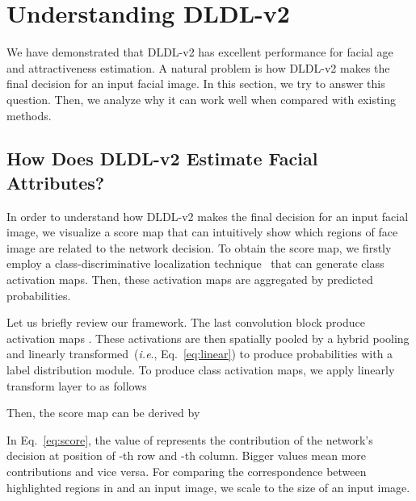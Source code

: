 \documentclass[5p,times,twocolumn]{elsarticle}
\makeatletter
\DeclareRobustCommand\onedot{\@onedot}
\def\@onedot{.}
\def\ie{\emph{i.e}\onedot}
\makeatother
\begin{document}
\section{Understanding DLDL-v2}\label{sec:ud}
We have demonstrated that DLDL-v2 has excellent performance for facial age and attractiveness estimation. A natural problem is how DLDL-v2 makes the final decision for an input facial image. In this section, we try to answer this question. Then, we analyze why it can work well when compared with existing methods.

\subsection{How Does DLDL-v2 Estimate Facial Attributes?}
In order to understand how DLDL-v2 makes the final decision for an input facial image, we visualize a score map that can intuitively show which regions of face image are related to the network decision. To obtain the score map, we firstly employ a class-discriminative localization technique~\cite{zhou2016learning} that can generate class activation maps. Then, these activation maps are aggregated by predicted probabilities. 

Let us briefly review our framework. The last convolution block produce activation maps . These activations are then spatially pooled by a hybrid pooling and linearly transformed~(\ie, Eq.~\eqref{eq:linear}) to produce probabilities  with a label distribution module. To produce class activation maps, we apply linearly transform layer to  as follows

Then, the score map can be derived by

In Eq.~\eqref{eq:score}, the value of  represents the contribution of the network's decision at position of -th row and -th column. Bigger values mean more contributions and vice versa.  For comparing the correspondence between highlighted regions in  and an input image, we scale  to the size of an input image. 
\end{document}
